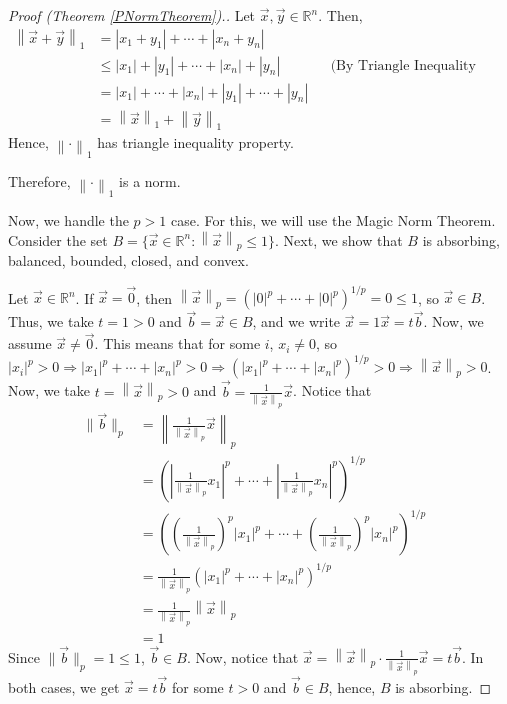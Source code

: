 \documentclass{article}
\renewcommand{\implies}{\Rightarrow}
\newcommand{\R}{\mathbb{R}}
\newcommand{\norm}[1]{\left\|#1\right\|}
\theoremstyle{plain} %
\numberwithin{thm}{section} %
\theoremstyle{definition} %
\begin{document}
\begin{proof}[Proof (Theorem \ref{PNormTheorem}).]
 Let $\vec{x}, \vec{y} \in \R^n$. Then,
\begin{align*}
    \norm{\vec{x} + \vec{y}}_1
    &= |x_1 + y_1| + \cdots + |x_n + y_n| &\\
    &\leq |x_1| + |y_1| + \cdots + |x_n| + |y_n| &&\text{(By Triangle Inequality for Absolute Value)} &&\\
    &= |x_1| + \cdots + |x_n| + |y_1| + \cdots + |y_n| &\\
    &= \norm{\vec{x}}_1 + \norm{\vec{y}}_1
\end{align*}
Hence, $\norm{\cdot}_1$ has triangle inequality property.

Therefore, $\norm{\cdot}_1$ is a norm.

Now, we handle the $p > 1$ case. For this, we will use the Magic Norm Theorem. Consider the set $B = \{\vec{x} \in \R^n: \norm{\vec{x}}_p \leq 1\}$. Next, we show that $B$ is absorbing, balanced, bounded, closed, and convex.

 Let $\vec{x} \in \R^n$. If $\vec{x} = \vec{0}$, then $\norm{\vec{x}}_p = \left(|0|^p + \cdots + |0|^p\right)^{1/p} = 0 \leq 1$, so $\vec{x} \in B$. Thus, we take $t = 1 > 0$ and $\vec{b} = \vec{x} \in B$, and we write $\vec{x} = 1\vec{x} = t\vec{b}$. Now, we assume $\vec{x} \neq \vec{0}$. This means that for some $i$, $x_i \neq 0$, so $|x_i|^p > 0 \implies |x_1|^p + \cdots + |x_n|^p > 0 \implies (|x_1|^p + \cdots + |x_n|^p)^{1/p} > 0 \implies \norm{\vec{x}}_p > 0$. Now, we take $t = \norm{\vec{x}}_p > 0$ and $\vec{b} = \frac{1}{\norm{\vec{x}}_p}\vec{x}$. Notice that
\begin{align*}
    \|\vec{b}\|_p 
    &= \norm{\frac{1}{\norm{\vec{x}}_p}\vec{x}}_p &\\
    &= \left(\left|\frac{1}{\norm{\vec{x}}_p}x_1\right|^p + \cdots + \left|\frac{1}{\norm{\vec{x}}_p}x_n\right|^p\right)^{1/p} &\\
    &= \left(\left(\frac{1}{\norm{\vec{x}}_p}\right)^p|x_1|^p + \cdots + \left(\frac{1}{\norm{\vec{x}}_p}\right)^p|x_n|^p\right)^{1/p} &\\
    &= \frac{1}{\norm{\vec{x}}_p}\left(|x_1|^p + \cdots + |x_n|^p\right)^{1/p} &\\
    &= \frac{1}{\norm{\vec{x}}_p}\norm{\vec{x}}_p &\\
    &= 1
\end{align*}
Since $\|\vec{b}\|_p = 1 \leq 1$, $\vec{b} \in B$. Now, notice that $\vec{x} = \norm{\vec{x}}_p \cdot \frac{1}{\norm{\vec{x}}_p}\vec{x} = t\vec{b}$. In both cases, we get $\vec{x} = t\vec{b}$ for some $t > 0$ and $\vec{b} \in B$, hence, $B$ is absorbing.


\end{proof}
\end{document}
